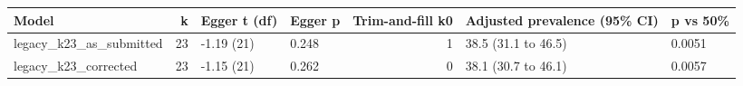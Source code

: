 
\begin{tabular}{lrllrll}
\toprule
Model & k & Egger t (df) & Egger p & Trim-and-fill k0 & Adjusted prevalence (95\% CI) & p vs 50\%\\
\midrule
legacy\_k23\_as\_submitted & 23 & -1.19 (21) & 0.248 & 1 & 38.5 (31.1 to 46.5) & 0.0051\\
legacy\_k23\_corrected & 23 & -1.15 (21) & 0.262 & 0 & 38.1 (30.7 to 46.1) & 0.0057\\
\bottomrule
\end{tabular}
